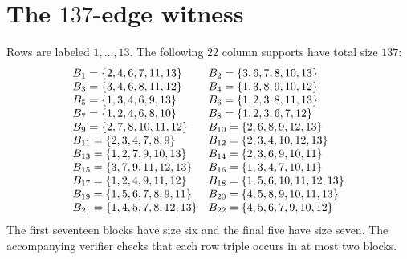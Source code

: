 \documentclass[10pt,a4paper]{amsart}
\begin{document}
\section{The $137$-edge witness}\label{app:witness}
\label{sec:witness-appendix}
Rows are labeled $1,\dots,13$. The following $22$ column supports have total size $137$:
\[
\begin{array}{@{}ll@{}}
B_{1}=\{2,4,6,7,11,13\} & B_{2}=\{3,6,7,8,10,13\}\\
B_{3}=\{3,4,6,8,11,12\} & B_{4}=\{1,3,8,9,10,12\}\\
B_{5}=\{1,3,4,6,9,13\} & B_{6}=\{1,2,3,8,11,13\}\\
B_{7}=\{1,2,4,6,8,10\} & B_{8}=\{1,2,3,6,7,12\}\\
B_{9}=\{2,7,8,10,11,12\} & B_{10}=\{2,6,8,9,12,13\}\\
B_{11}=\{2,3,4,7,8,9\} & B_{12}=\{2,3,4,10,12,13\}\\
B_{13}=\{1,2,7,9,10,13\} & B_{14}=\{2,3,6,9,10,11\}\\
B_{15}=\{3,7,9,11,12,13\} & B_{16}=\{1,3,4,7,10,11\}\\
B_{17}=\{1,2,4,9,11,12\} & B_{18}=\{1,5,6,10,11,12,13\}\\
B_{19}=\{1,5,6,7,8,9,11\} & B_{20}=\{4,5,8,9,10,11,13\}\\
B_{21}=\{1,4,5,7,8,12,13\} & B_{22}=\{4,5,6,7,9,10,12\}\\
\end{array}
\]
The first seventeen blocks have size six and the final five have size seven. The accompanying verifier checks that each row triple occurs in at most two blocks.
\end{document}
